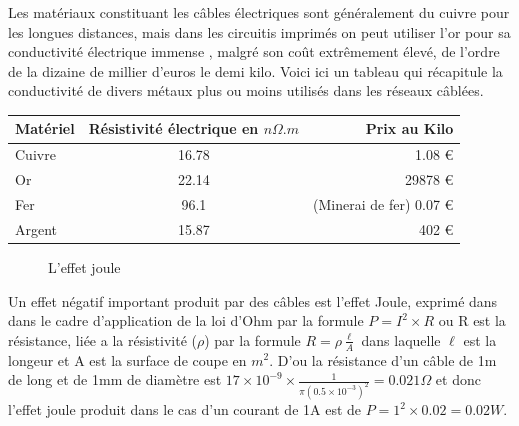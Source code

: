 \documentclass[12pt]{report}
\begin{document}
	Les matériaux constituant les câbles électriques sont généralement du cuivre pour les longues distances, mais dans les circuitis imprimés on peut utiliser l'or pour sa conductivité électrique immense , malgré son coût extrêmement élevé, de l'ordre de la dizaine de millier d'euros le demi kilo. Voici ici un tableau qui récapitule la conductivité de divers métaux plus ou moins utilisés dans les réseaux câblées.

\begin{center}
\begin{tabular}{| l | c | r |}
	\hline
	Matériel & Résistivité électrique en \( n\Omega .m \)& Prix au Kilo \\
	\hline
	Cuivre & 16.78 & 1.08 \euro{}  \\
	Or & 22.14 & 29878 \euro{}  \\
	Fer & 96.1 & (Minerai de fer) 0.07 \euro{}  \\
	Argent & 15.87 & 402 \euro{}  \\
	\hline
\end{tabular}
\end{center}

\begin{figure}
  \begin{center}
    \setlength\fboxsep{0pt}
    \setlength\fboxrule{0.5pt}
  \end{center}
  \caption{L'effet joule}
\end{figure}Un effet négatif important produit par des câbles est l'effet Joule, exprimé dans dans le cadre d'application de la loi d'Ohm par la formule \( P=I^{2} \times R\)\cite{wiki2} ou R est la résistance, liée a la résistivité (\(\rho\)) par la formule \( R= \rho \frac{\ell}{A} \)\cite{wiki3} dans laquelle \(\ell\) est la longeur et A est la surface de coupe en \(m^2\).
D'ou la résistance d'un câble de 1m de long et de 1mm de diamètre est \(17 \times 10^{-9} \times \frac{1}{\pi (0.5 \times 10^{-3})^{2}} = 0.021 \Omega \) et donc l'effet joule produit dans le cas d'un courant de 1A est de \( P=1^{2} \times 0.02 = 0.02 W\).
\end{document}
